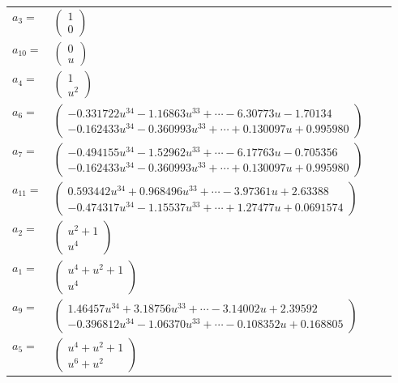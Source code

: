 \documentclass[1p]{elsarticle_modified}
\theoremstyle{definition}
\begin{document}
\begin{tabular}{m{7pt} m{180pt} m{7pt} m{180pt} }
\flushright $a_{3}=$&$\begin{pmatrix}1\\0\end{pmatrix}$ \\
\flushright $a_{10}=$&$\begin{pmatrix}0\\u\end{pmatrix}$ \\
\flushright $a_{4}=$&$\begin{pmatrix}1\\u^2\end{pmatrix}$ \\
\flushright $a_{6}=$&$\begin{pmatrix}-0.331722 u^{34}-1.16863 u^{33}+\cdots-6.30773 u-1.70134\\-0.162433 u^{34}-0.360993 u^{33}+\cdots+0.130097 u+0.995980\end{pmatrix}$ \\
\flushright $a_{7}=$&$\begin{pmatrix}-0.494155 u^{34}-1.52962 u^{33}+\cdots-6.17763 u-0.705356\\-0.162433 u^{34}-0.360993 u^{33}+\cdots+0.130097 u+0.995980\end{pmatrix}$ \\
\flushright $a_{11}=$&$\begin{pmatrix}0.593442 u^{34}+0.968496 u^{33}+\cdots-3.97361 u+2.63388\\-0.474317 u^{34}-1.15537 u^{33}+\cdots+1.27477 u+0.0691574\end{pmatrix}$ \\
\flushright $a_{2}=$&$\begin{pmatrix}u^2+1\\u^4\end{pmatrix}$ \\
\flushright $a_{1}=$&$\begin{pmatrix}u^4+u^2+1\\u^4\end{pmatrix}$ \\
\flushright $a_{9}=$&$\begin{pmatrix}1.46457 u^{34}+3.18756 u^{33}+\cdots-3.14002 u+2.39592\\-0.396812 u^{34}-1.06370 u^{33}+\cdots-0.108352 u+0.168805\end{pmatrix}$ \\
\flushright $a_{5}=$&$\begin{pmatrix}u^4+u^2+1\\u^6+u^2\end{pmatrix}$ \\

\end{tabular}
\end{document}
